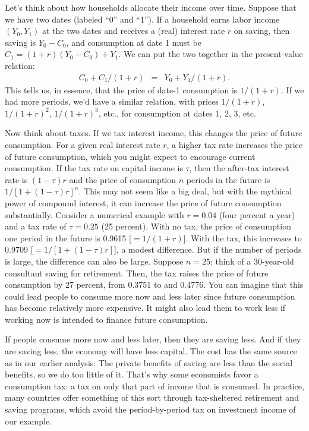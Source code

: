 Let's think about how households allocate their income over time.
Suppose that we have two dates (labeled ``0'' and ``1'').
If a household earns labor income $(Y_0,Y_1)$ at the two dates
and receives
a (real) interest rate $r$ on saving,
then saving is $ Y_0 - C_0$, and
consumption at date 1 must be
$ C_1 = (1+r) (Y_0 - C_0) + Y_1 $.
We can put the two together in the present-value relation:
\begin{eqnarray*}
    C_0 + C_1/(1+r) &=&  Y_0 + Y_1/(1+r) .
\end{eqnarray*}
This tells us, in essence, that the price of date-1 consumption
is $1/(1+r)$.
If we had more periods, we'd have a similar relation,
with prices $1/(1+r)$, $1/(1+r)^2$, $1/(1+r)^3$, etc.,
for consumption at dates 1, 2, 3, etc.


Now think about taxes.  If we tax interest income, this changes
the price of future consumption.
For a given real interest rate $r$,
a higher tax rate increases the price of future consumption,
which you might expect to encourage current consumption.
If the tax rate on capital income is $\tau$,
then the after-tax interest rate is $ (1-\tau) r$
and the price of consumption $n$ periods in the future
is $ 1/[1+(1-\tau)r]^n $.
This may not seem like a big deal,
but with the mythical power of compound interest,
it can increase the price of future consumption substantially.
Consider a numerical example with $r = 0.04$ (four percent a year)
and a tax rate of $\tau = 0.25$ (25 percent).
With no tax, the price of consumption one period in the future
is 0.9615 [$=1/(1+r)$].
With the tax, this increases to 0.9709 [$=1/[1+(1-\tau)r]$],
a modest difference.
But if the number of periods is large, the difference can also be large.
Suppose $n=25$; think of a 30-year-old consultant saving for
retirement.
Then, the tax raises the price of future consumption by 27 percent,
from 0.3751 to and 0.4776.
You can imagine that this could lead people to consume more now
and less later since future consumption has become relatively
more expensive.
It might also lead them to work less if working now
is intended to finance future consumption.


If people consume more now and less later, then
they are saving less.
And if they are saving less,
the economy will have less capital.
The cost has the same source as in our earlier analysis: The private benefits of saving are less than the social benefits,
so we do too little of it.
That's why some economists favor a consumption tax:  a tax on only
that part of income that is consumed.
In practice, many countries offer something of this sort
through tax-sheltered retirement and saving programs,
which avoid the period-by-period tax on investment income
of our example.

